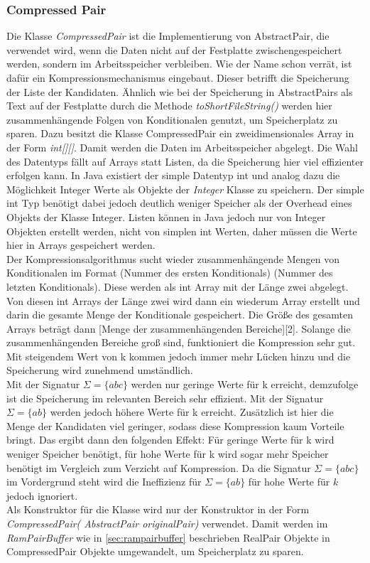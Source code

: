 \documentclass[12pt,a4paper]{article}
\begin{document}
\subsubsection{Compressed Pair}
Die Klasse  \textit{CompressedPair} ist die Implementierung von AbstractPair, die verwendet wird, wenn die Daten nicht auf der Festplatte zwischengespeichert werden, sondern im Arbeitsspeicher verbleiben. Wie der Name schon verrät, ist dafür ein Kompressionsmechanismus eingebaut. Dieser betrifft die Speicherung der Liste der Kandidaten. Ähnlich wie bei der Speicherung in AbstractPairs als Text auf der Festplatte durch die Methode \textit{toShortFileString()} werden hier zusammenhängende Folgen von Konditionalen genutzt, um Speicherplatz zu sparen. Dazu besitzt die Klasse CompressedPair ein zweidimensionales Array in der Form \textit{int[][]}. Damit werden die Daten im Arbeitsspeicher abgelegt. Die Wahl des Datentyps fällt auf Arrays statt Listen, da die Speicherung hier viel effizienter erfolgen kann. In Java existiert der simple Datentyp int und analog dazu die Möglichkeit Integer Werte als Objekte der \textit{Integer} Klasse zu speichern. Der simple int Typ benötigt dabei jedoch deutlich weniger Speicher als der Overhead eines Objekts der Klasse Integer. Listen können in Java jedoch nur von Integer Objekten erstellt werden, nicht von simplen int Werten, daher müssen die Werte hier in Arrays gespeichert werden.\\
Der Kompressionsalgorithmus sucht wieder zusammenhängende Mengen von Konditionalen im Format (Nummer des ersten Konditionals) (Nummer des letzten Konditionals). Diese werden als int Array mit der Länge zwei abgelegt. Von diesen int Arrays der Länge zwei wird dann ein wiederum Array erstellt und darin die gesamte Menge der Konditionale gespeichert. Die Größe des gesamten Arrays beträgt dann [Menge der zusammenhängenden Bereiche][2]. Solange die zusammenhängenden Bereiche groß sind, funktioniert die Kompression sehr gut. Mit steigendem Wert von k kommen jedoch immer mehr Lücken hinzu und die Speicherung wird zunehmend umständlich. \\
Mit der Signatur $\Sigma=\{abc\}$ werden nur geringe Werte für k erreicht, demzufolge ist die Speicherung im relevanten Bereich sehr effizient. Mit der Signatur $\Sigma=\{ab\}$ werden jedoch höhere Werte für k erreicht. Zusätzlich ist hier die Menge der Kandidaten viel geringer, sodass diese Kompression kaum Vorteile bringt. Das ergibt dann den folgenden Effekt: Für geringe Werte für k wird weniger Speicher benötigt, für hohe Werte für k wird sogar mehr Speicher benötigt im Vergleich zum Verzicht auf Kompression. Da die Signatur  $\Sigma=\{abc\}$ im Vordergrund steht wird die Ineffizienz für $\Sigma=\{ab\}$ für hohe Werte für $k$  jedoch ignoriert.\\
Als Konstruktor für die Klasse wird nur der Konstruktor in der Form \textit{CompressedPair( AbstractPair originalPair)} verwendet. Damit werden im \textit{RamPairBuffer} wie in \autoref{sec:rampairbuffer} beschrieben RealPair Objekte in CompressedPair Objekte umgewandelt, um Speicherplatz zu sparen.
\end{document}
